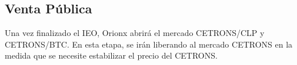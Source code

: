 \subsection{Venta Pública}
Una vez finalizado el IEO, Orionx abrirá el mercado CETRONS/CLP y CETRONS/BTC. En esta etapa, se irán liberando al mercado CETRONS en la medida que se necesite estabilizar el precio del CETRONS. 
